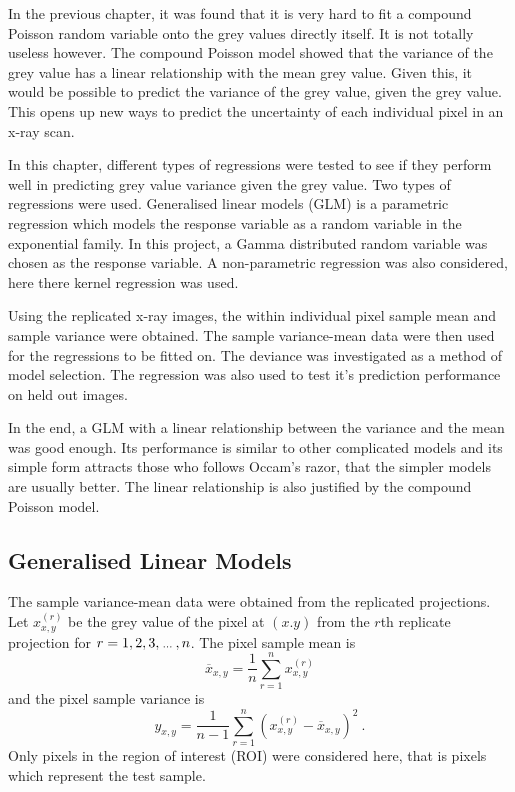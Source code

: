 In the previous chapter, it was found that it is very hard to fit a compound Poisson random variable onto the grey values directly itself. It is not totally useless however. The compound Poisson model showed that the variance of the grey value has a linear relationship with the mean grey value. Given this, it would be possible to predict the variance of the grey value, given the grey value. This opens up new ways to predict the uncertainty of each individual pixel in an x-ray scan.

In this chapter, different types of regressions were tested to see if they perform well in predicting grey value variance given the grey value. Two types of regressions were used. Generalised linear models \citep{nelder1972generalized} \citep{nelder1972generalized_2} \citep{mccullagh1984generalized} (GLM) is a parametric regression which models the response variable as a random variable in the exponential family. In this project, a Gamma distributed random variable was chosen as the response variable. A non-parametric regression was also considered, here there kernel regression \citep{friedman2001elements} was used.

Using the replicated x-ray images, the within individual pixel sample mean and sample variance were obtained. The sample variance-mean data were then used for the regressions to be fitted on. The deviance was investigated as a method of model selection. The regression was also used to test it's prediction performance on held out images.

In the end, a GLM with a linear relationship between the variance and the mean was good enough. Its performance is similar to other complicated models and its simple form attracts those who follows Occam's razor, that the simpler models are usually better. The linear relationship is also justified by the compound Poisson model.

\subsection{Generalised Linear Models}

The sample variance-mean data were obtained from the replicated projections. Let $x_{x,y}^{(r)}$ be the grey value of the pixel at $(x.y)$ from the $r$th replicate projection for $r=1,2,3,\dotdotdot,n$. The pixel sample mean is
\begin{equation}
    \overline{x}_{x,y}=\frac{1}{n}\sum_{r=1}^n x_{x,y}^{(r)}
\end{equation}
and the pixel sample variance is
\begin{equation}
    y_{x,y} =
    \frac{1}{n-1}
    \sum_{r=1}^n
        \left(
            x_{x,y}^{(r)} - \overline{x}_{x,y}
        \right)^2
    \ .
\end{equation}
Only pixels in the region of interest (ROI) were considered here, that is pixels which represent the test sample.

